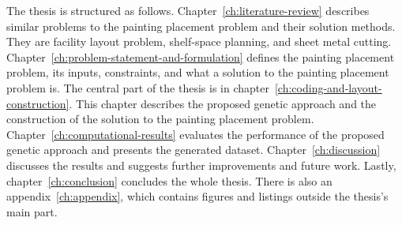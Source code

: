 The thesis is structured as follows.
Chapter~\ref{ch:literature-review} describes similar problems to the painting placement problem and their solution methods.
They are facility layout problem, shelf-space planning, and sheet metal cutting.
Chapter~\ref{ch:problem-statement-and-formulation} defines the painting placement problem, its inputs, constraints, and what a solution to the painting placement problem is.
The central part of the thesis is in chapter~\ref{ch:coding-and-layout-construction}.
This chapter describes the proposed genetic approach and the construction of the solution to the painting placement problem.
Chapter~\ref{ch:computational-results} evaluates the performance of the proposed genetic approach
and presents the generated dataset.
Chapter~\ref{ch:discussion} discusses the results and suggests further improvements and future work.
Lastly, chapter~\ref{ch:conclusion} concludes the whole thesis.
There is also an appendix~\ref{ch:appendix}, which contains figures and listings outside the thesis's main part.
